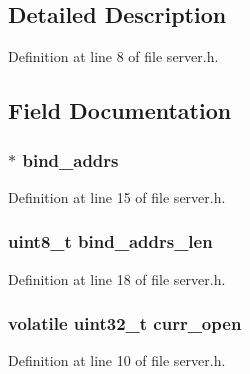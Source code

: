 \subsection{Detailed Description}


Definition at line 8 of file server.\+h.



\subsection{Field Documentation}
\subsubsection[{\texorpdfstring{bind\+\_\+addrs}{bind_addrs}}]{$\ast$ bind\+\_\+addrs}\hypertarget{structserver_a8a3fd504da6b2635eba92ed2e3c53b17}{}\label{structserver_a8a3fd504da6b2635eba92ed2e3c53b17}


Definition at line 15 of file server.\+h.

\subsubsection[{\texorpdfstring{bind\+\_\+addrs\+\_\+len}{bind_addrs_len}}]{\setlength{\rightskip}{0pt plus 5cm}uint8\+\_\+t bind\+\_\+addrs\+\_\+len}\hypertarget{structserver_a9b4b0a9ca9692a41f452b322803adea4}{}\label{structserver_a9b4b0a9ca9692a41f452b322803adea4}


Definition at line 18 of file server.\+h.

\subsubsection[{\texorpdfstring{curr\+\_\+open}{curr_open}}]{\setlength{\rightskip}{0pt plus 5cm}volatile uint32\+\_\+t curr\+\_\+open}\hypertarget{structserver_a86e24d82855089d55604d963f461c68b}{}\label{structserver_a86e24d82855089d55604d963f461c68b}


Definition at line 10 of file server.\+h.

